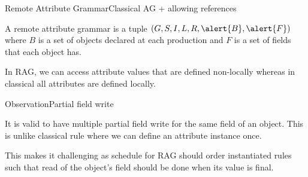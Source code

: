 \begin{frame}{Remote Attribute Grammar}{Classical AG + allowing references}
\begin{definition}
A remote attribute grammar is a tuple $(G,S,I,L,R,\alert{B},\alert{F})$ where \alert{$B$ is a set of objects} declared at each production and \alert{$F$ is a set of fields} that each object has.
\end{definition}

\newlinevspace

In RAG, we can access attribute values that are defined \alert{non-locally} whereas in classical all attributes are defined \alert{locally}.

\end{frame}







\begin{frame}{Observation}{Partial field write}

It is valid to have \alert{multiple partial field write} for the same field of an object. This is \alert{unlike classical rule} where we can define an attribute instance \alert{once}.

\newlinevspace

This makes it challenging as schedule for RAG should order instantiated rules such that \alert{read of the object's field} should be done when its value is \alert{final}. 

\end{frame}






